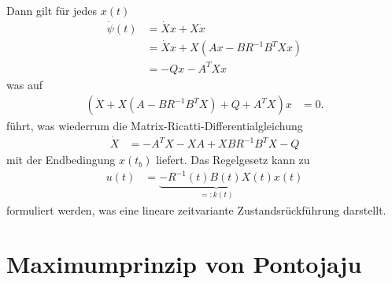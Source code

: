 Dann gilt für jedes $x(t)$
\begin{align*}
	\dot{\psi}(t) & = \dot{X}x + X\dot{x}\\
	& = \dot{X}x + X\left(Ax-BR^{-1}B^TXx \right)\\
	& = -Qx-A^TXx
\end{align*}
was auf
\begin{align*}
	\left(\dot{X} + X\left(A-BR^{-1}B^TX \right) + Q +A^TX \right)x & = 0.
\end{align*}
führt, was wiederrum die Matrix-Ricatti-Differentialgleichung
\begin{align*}
	\dot{X} & = -A^TX -XA + XBR^{-1}B^TX -Q
\end{align*}
mit der Endbedingung $x(t_b)$ liefert. Das Regelgesetz kann zu
\begin{align*}
	u(t) & = \underbrace{-R^{-1}(t)B(t)X(t)}_{=:k(t)}x(t)
\end{align*}
formuliert werden, was eine lineare zeitvariante Zustandsrückführung darstellt.

\section{Maximumprinzip von Pontojaju}
